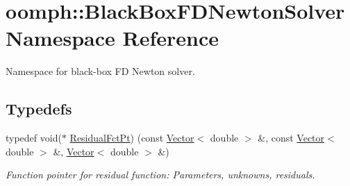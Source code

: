 \hypertarget{namespaceoomph_1_1BlackBoxFDNewtonSolver}{}\section{oomph\+:\+:Black\+Box\+F\+D\+Newton\+Solver Namespace Reference}
\label{namespaceoomph_1_1BlackBoxFDNewtonSolver}


Namespace for black-\/box FD Newton solver.  


\subsection*{Typedefs}
\begin{DoxyCompactItemize}
\item 
typedef void($\ast$ \hyperlink{namespaceoomph_1_1BlackBoxFDNewtonSolver_a0b45d0bd1b7ae8ff5c24715b6118d1fd}{Residual\+Fct\+Pt}) (const \hyperlink{classoomph_1_1Vector}{Vector}$<$ double $>$ \&, const \hyperlink{classoomph_1_1Vector}{Vector}$<$ double $>$ \&, \hyperlink{classoomph_1_1Vector}{Vector}$<$ double $>$ \&)
\begin{DoxyCompactList}\small\item\em Function pointer for residual function\+: Parameters, unknowns, residuals. \end{DoxyCompactList}\end{DoxyCompactItemize}
